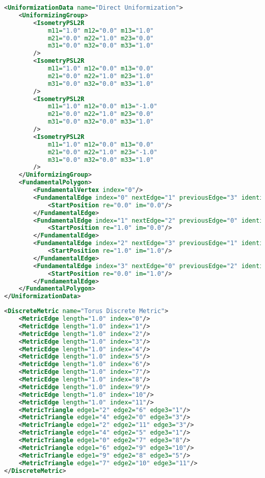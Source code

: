 \documentclass[Thesis.tex]{subfiles}
\begin{document}
\begin{lstlisting}[label=lst:hyperelliptic_xml, caption={A torus given by its uniformizing group and a fundamental polygon. The elements of the group are either euclidean motions or hyperbolic motions given as elements of $\mathbb PSL_2$.}, numbers=none, language=XML, captionpos=b]
<UniformizationData name="Direct Uniformization">
	<UniformizingGroup>
		<IsometryPSL2R 
			m11="1.0" m12="0.0" m13="1.0" 
			m21="0.0" m22="1.0" m23="0.0" 
			m31="0.0" m32="0.0" m33="1.0"
		/>
		<IsometryPSL2R 
			m11="1.0" m12="0.0" m13="0.0" 
			m21="0.0" m22="1.0" m23="1.0" 
			m31="0.0" m32="0.0" m33="1.0"
		/>
		<IsometryPSL2R 
			m11="1.0" m12="0.0" m13="-1.0" 
			m21="0.0" m22="1.0" m23="0.0" 
			m31="0.0" m32="0.0" m33="1.0"
		/>
		<IsometryPSL2R 
			m11="1.0" m12="0.0" m13="0.0" 
			m21="0.0" m22="1.0" m23="-1.0" 
			m31="0.0" m32="0.0" m33="1.0"
		/>
	</UniformizingGroup>
	<FundamentalPolygon>
		<FundamentalVertex index="0"/>
		<FundamentalEdge index="0" nextEdge="1" previousEdge="3" identifiedEdge="2" startVertex="0">
			<StartPosition re="0.0" im="0.0"/>
		</FundamentalEdge>
		<FundamentalEdge index="1" nextEdge="2" previousEdge="0" identifiedEdge="3" startVertex="0">
			<StartPosition re="1.0" im="0.0"/>
		</FundamentalEdge>
		<FundamentalEdge index="2" nextEdge="3" previousEdge="1" identifiedEdge="0" startVertex="0">
			<StartPosition re="1.0" im="1.0"/>
		</FundamentalEdge>
		<FundamentalEdge index="3" nextEdge="0" previousEdge="2" identifiedEdge="1" startVertex="0">
			<StartPosition re="0.0" im="1.0"/>
		</FundamentalEdge>
	</FundamentalPolygon>
</UniformizationData>
\end{lstlisting}

\begin{lstlisting}[label=lst:hyperelliptic_xml, caption={A wente torus given by a discrete metric. Vertices are given implitly
by following the order of triangle glueings.}, numbers=none, language=XML, captionpos=b]
<DiscreteMetric name="Torus Discrete Metric">
	<MetricEdge length="1.0" index="0"/>
	<MetricEdge length="1.0" index="1"/>
	<MetricEdge length="1.0" index="2"/>
	<MetricEdge length="1.0" index="3"/>
	<MetricEdge length="1.0" index="4"/>
	<MetricEdge length="1.0" index="5"/>
	<MetricEdge length="1.0" index="6"/>
	<MetricEdge length="1.0" index="7"/>
	<MetricEdge length="1.0" index="8"/>
	<MetricEdge length="1.0" index="9"/>
	<MetricEdge length="1.0" index="10"/>
	<MetricEdge length="1.0" index="11"/>
	<MetricTriangle edge1="2" edge2="6" edge3="1"/>
	<MetricTriangle edge1="4" edge2="0" edge3="3"/>
	<MetricTriangle edge1="2" edge2="11" edge3="3"/>
	<MetricTriangle edge1="4" edge2="5" edge3="1"/>
	<MetricTriangle edge1="0" edge2="7" edge3="8"/>
	<MetricTriangle edge1="6" edge2="9" edge3="10"/>
	<MetricTriangle edge1="9" edge2="8" edge3="5"/>
	<MetricTriangle edge1="7" edge2="10" edge3="11"/>
</DiscreteMetric>
\end{lstlisting}
\end{document}
